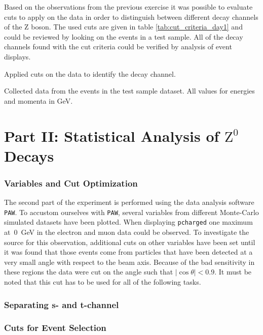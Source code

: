 \documentclass[11pt, a4paper]{article}
\numberwithin{equation}{section}
\begin{document}
Based on the observations from the previous exercise it was possible to evaluate cuts to apply on the data in order to distinguish between different decay channels of the Z boson.
The used cuts are given in table \ref{tab:cut_criteria_day1} and could be reviewed by looking on the events in a test sample.
All of the decay channels found with the cut criteria could be verified by analysis of event displays.
\begin{table}[h]
	\centering
	
	\caption{Applied cuts on the data to identify the decay channel.}
	\label{tab:cut_criteria_day1}
\end{table}
\begin{table}[h]
	\centering
	\resizebox{\textwidth}{!}{
		
	}
	\caption{Collected data from the events in the test sample dataset. All values for energies and momenta in \si{GeV}.}
\end{table}

\clearpage
\section{Part II: Statistical Analysis of $\mathrm{Z}^0$ Decays}

\subsubsection{Variables and Cut Optimization}
The second part of the experiment is performed using the data analysis software \texttt{PAW}.
To accustom ourselves with \texttt{PAW}, several variables from different Monte-Carlo simulated datasets have been plotted.
When displaying \texttt{pcharged} one maximum at~\SI{0}{GeV} in the electron and muon data could be observed.
To investigate the source for this observation, additional cuts on other variables have been set until it was found that those events come from particles that have been detected at a very small angle with respect to the beam axis.
Because of the bad sensitivity in these regions the data were cut on the angle such that $\left|\cos\theta\right|<\num{0.9}$.
It must be noted that this cut has to be used for all of the following tasks.

\subsubsection{Separating s- and t-channel}

\subsubsection{Cuts for Event Selection}
\end{document}
